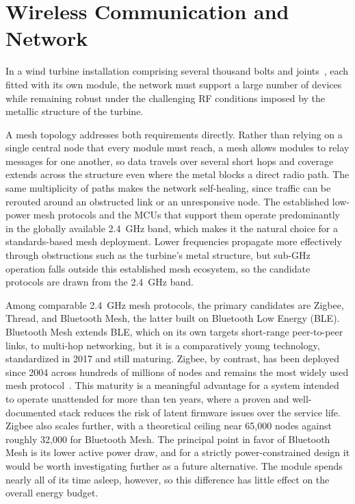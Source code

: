 \section{Wireless Communication and Network}
 
In a wind turbine installation comprising several thousand bolts and joints~\cite{6000bolts}, each fitted with its own module, the network must support a large number of devices while remaining robust under the challenging RF conditions imposed by the metallic structure of the turbine.

A mesh topology addresses both requirements directly. Rather than relying on a single central node that every module must reach, a mesh allows modules to relay messages for one another, so data travels over several short hops and coverage extends across the structure even where the metal blocks a direct radio path. The same multiplicity of paths makes the network self-healing, since traffic can be rerouted around an obstructed link or an unresponsive node. The established low-power mesh protocols and the MCUs that support them operate predominantly in the globally available \SI{2.4}{\giga\hertz} band, which makes it the natural choice for a standards-based mesh deployment. Lower frequencies propagate more effectively through obstructions such as the turbine's metal structure, but sub-\si{\giga\hertz} operation falls outside this established mesh ecosystem, so the candidate protocols are drawn from the \SI{2.4}{\giga\hertz} band.

Among comparable \SI{2.4}{\giga\hertz} mesh protocols, the primary candidates are Zigbee, Thread, and Bluetooth Mesh, the latter built on Bluetooth Low Energy (BLE). Bluetooth Mesh extends BLE, which on its own targets short-range peer-to-peer links, to multi-hop networking, but it is a comparatively young technology, standardized in 2017 and still maturing. Zigbee, by contrast, has been deployed since 2004 across hundreds of millions of nodes and remains the most widely used mesh protocol~\cite{Avnet_zigbee_ble}. This maturity is a meaningful advantage for a system intended to operate unattended for more than ten years, where a proven and well-documented stack reduces the risk of latent firmware issues over the service life. Zigbee also scales further, with a theoretical ceiling near 65,000 nodes against roughly 32,000 for Bluetooth Mesh. The principal point in favor of Bluetooth Mesh is its lower active power draw, and for a strictly power-constrained design it would be worth investigating further as a future alternative. The module spends nearly all of its time asleep, however, so this difference has little effect on the overall energy budget.

